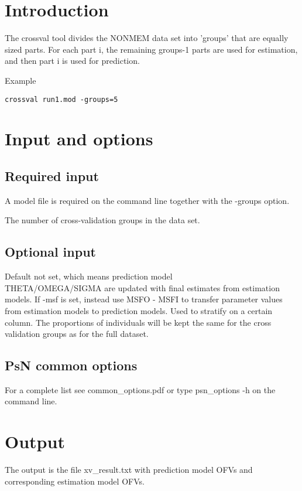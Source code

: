 

\usepackage{hyperref}



\maketitle
\newcommand{\guidetoolname}{crossval}
\tableofcontents
\newpage

\section{Introduction}

The crossval tool divides the NONMEM data set into 'groups' that are equally sized parts.
For each part i, the remaining groups-1 parts are used for estimation,
and then part i is used for prediction.

Example
\begin{verbatim}
crossval run1.mod -groups=5
\end{verbatim}

\section{Input and options}
	
\subsection{Required input}
A model file is required on the command line together with the -groups option.
\begin{optionlist}
The number of cross-validation groups in the data set.
\nextopt		
\end{optionlist}

\subsection{Optional input}
			
\begin{optionlist}
Default not set, which means prediction model\\
THETA/OMEGA/SIGMA are updated with final estimates from estimation models.
If -msf is set, instead use MSFO - MSFI to transfer parameter values from estimation models to prediction models.
\nextopt
	Used to stratify on a certain column. The proportions of individuals
    will be kept the same for the cross validation groups as for the 
    full dataset.
    \nextopt
\end{optionlist}

\subsection{PsN common options}
For a complete list see common\_options.pdf or type psn\_options -h on the command line.

\section{Output}

The output is the file xv\_result.txt with prediction model OFVs and corresponding estimation model OFVs.



